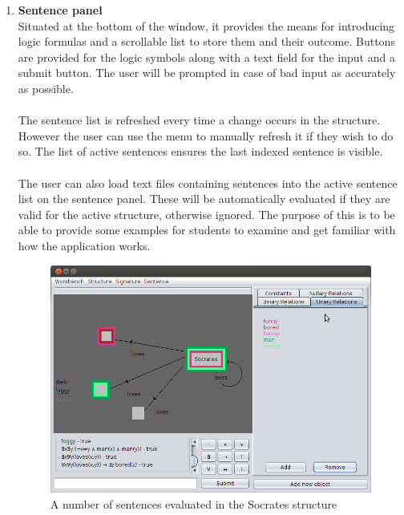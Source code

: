 \documentclass{report}
\begin{document}
\begin{enumerate}
\item \textbf{Sentence panel} \\
Situated at the bottom of the window, it provides the means for introducing 
logic formulas and a scrollable list to store them and their outcome. Buttons 
are provided for the logic symbols along with a text field for the input and a 
submit button. The user will be prompted in case of bad input as accurately as 
possible.
\\ \\
The sentence list is refreshed every time a change occurs in the 
structure. However the user can use the menu to manually refresh it if they 
wish to do so. The list of active sentences ensures the last indexed sentence 
is visible. 
\\ \\
The user can also load text files containing sentences into the active sentence
list on the sentence panel. These will be automatically evaluated if they are 
valid for the active structure, otherwise ignored. The purpose of this is to
be able to provide some examples for students to examine and get familiar with
how the application works.\\
\begin{figure}[h!]
\includegraphics[width=\textwidth]{socratesSentences.png}
\caption{A number of sentences evaluated in the Socrates structure}
\end{figure}
\end{enumerate}
\end{document}
